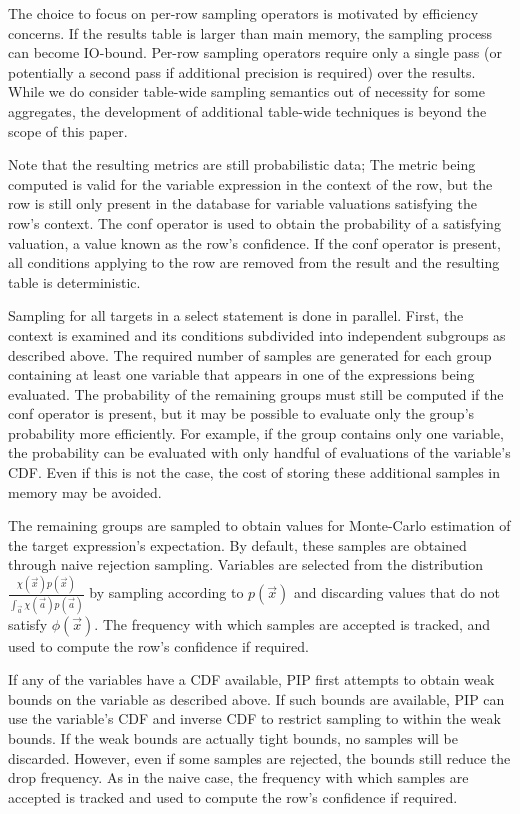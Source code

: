 The choice to focus on per-row sampling operators is motivated by efficiency concerns.  If the results table is larger than main memory, the sampling process can become IO-bound.  Per-row sampling operators require only a single pass (or potentially a second pass if additional precision is required) over the results.  While we do consider table-wide sampling semantics out of necessity for some aggregates, the development of additional table-wide techniques is beyond the scope of this paper.

Note that the resulting metrics are still probabilistic data; The metric being computed is valid for the variable expression in the context of the row, but the row is still only present in the database for variable valuations satisfying the row's context.  The conf operator is used to obtain the probability of a satisfying valuation, a value known as the row's confidence.  If the conf operator is present, all conditions applying to the row are removed from the result and the resulting table is deterministic.

Sampling for all targets in a select statement is done in parallel.  First, the context is examined and its conditions subdivided into independent subgroups as described above.  The required number of samples are generated for each group containing at least one variable that appears in one of the expressions being evaluated.  The probability of the remaining groups must still be computed if the conf operator is present, but it may be possible to evaluate only the group's probability more efficiently.  For example, if the group contains only one variable, the probability can be evaluated with only handful of evaluations of the variable's CDF.  Even if this is not the case, the cost of storing these additional samples in memory may be avoided.

The remaining groups are sampled to obtain values for Monte-Carlo estimation of the target expression's expectation.  By default, these samples are obtained through naive rejection sampling.  Variables are selected from the distribution $\frac{\chi(\vec{x})p(\vec{x})}{\int_{\vec{a}} \chi(\vec{a})p(\vec{a})}$ by sampling according to $p(\vec{x})$ and discarding values that do not satisfy $\phi(\vec{x})$.  The frequency with which samples are accepted is tracked, and used to compute the row's confidence if required.

If any of the variables have a CDF available, PIP first attempts to obtain weak bounds on the variable as described above.  If such bounds are available, PIP can use the variable's CDF and inverse CDF to restrict sampling to within the weak bounds.  If the weak bounds are actually tight bounds, no samples will be discarded.  However, even if some samples are rejected, the bounds still reduce the drop frequency.  As in the naive case, the frequency with which samples are accepted is tracked and used to compute the row's confidence if required.

